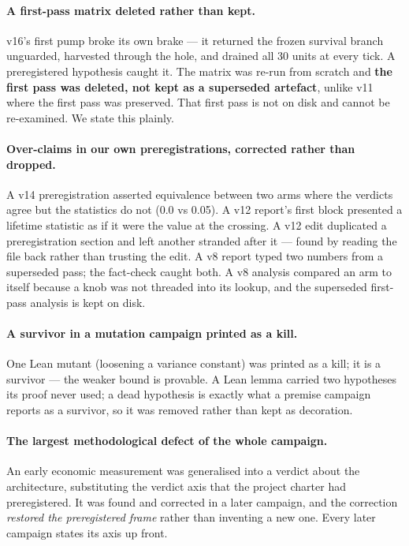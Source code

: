 \documentclass[11pt]{article}
\begin{document}
\paragraph{A first-pass matrix deleted rather than kept.} v16's first pump broke its
own brake --- it returned the frozen survival branch unguarded, harvested through the
hole, and drained all 30 units at every tick. A preregistered hypothesis caught it.
The matrix was re-run from scratch and \textbf{the first pass was deleted, not kept as
a superseded artefact}, unlike v11 where the first pass was preserved. That first pass
is not on disk and cannot be re-examined. We state this plainly.

\paragraph{Over-claims in our own preregistrations, corrected rather than dropped.}
A v14 preregistration asserted equivalence between two arms where the verdicts agree
but the statistics do not (0.0 vs 0.05). A v12 report's first block presented a
lifetime statistic as if it were the value at the crossing. A v12 edit duplicated a
preregistration section and left another stranded after it --- found by reading the
file back rather than trusting the edit. A v8 report typed two numbers from a
superseded pass; the fact-check caught both. A v8 analysis compared an arm to itself
because a knob was not threaded into its lookup, and the superseded first-pass analysis
is kept on disk.

\paragraph{A survivor in a mutation campaign printed as a kill.} One Lean mutant
(loosening a variance constant) was printed as a kill; it is a survivor --- the weaker
bound is provable. A Lean lemma carried two hypotheses its proof never used; a dead
hypothesis is exactly what a premise campaign reports as a survivor, so it was removed
rather than kept as decoration.

\paragraph{The largest methodological defect of the whole campaign.} An early
economic measurement was generalised into a verdict about the architecture,
substituting the verdict axis that the project charter had preregistered. It was found
and corrected in a later campaign, and the correction \emph{restored the preregistered
frame} rather than inventing a new one. Every later campaign states its axis up front.
\end{document}

